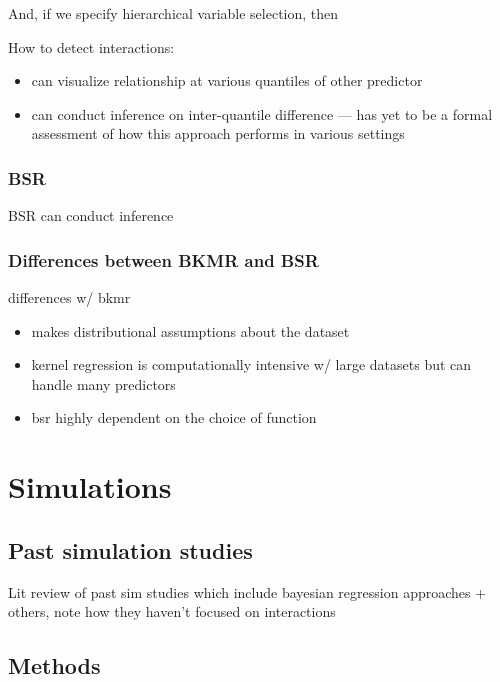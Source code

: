 \documentclass[12pt, twoside]{amherstthesis}
\providecommand{\tightlist}{%
  \setlength{\itemsep}{0pt}\setlength{\parskip}{0pt}}
\begin{document}
And, if we specify hierarchical variable selection, then

How to detect interactions:
\begin{itemize}
\tightlist
\item
  can visualize relationship at various quantiles of other predictor
\item
  can conduct inference on inter-quantile difference --- has yet to be a formal assessment of how this approach performs in various settings
\end{itemize}
\hypertarget{bsr-1}{%
\subsection{BSR}\label{bsr-1}}

BSR can conduct inference

\hypertarget{differences-between-bkmr-and-bsr}{%
\subsection{Differences between BKMR and BSR}\label{differences-between-bkmr-and-bsr}}

differences w/ bkmr
\begin{itemize}
\tightlist
\item
  makes distributional assumptions about the dataset
\item
  kernel regression is computationally intensive w/ large datasets but can handle many predictors
\item
  bsr highly dependent on the choice of function
\end{itemize}
\hypertarget{sims}{%
\chapter{Simulations}\label{sims}}

\hypertarget{past-simulation-studies}{%
\section{Past simulation studies}\label{past-simulation-studies}}

Lit review of past sim studies which include bayesian regression approaches + others, note how they haven't focused on interactions

\hypertarget{methods}{%
\section{Methods}\label{methods}}
\end{document}
